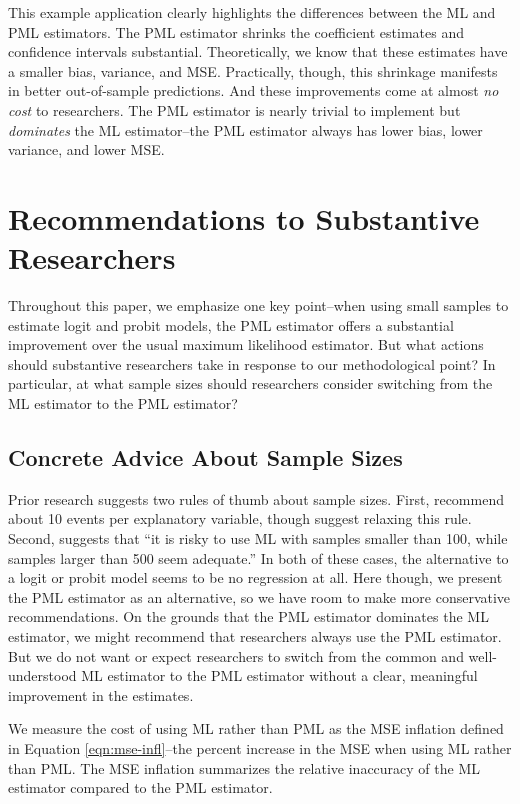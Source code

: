 \documentclass[12pt]{article}
\begin{document}
This example application clearly highlights the differences between the ML and PML estimators. 
The PML estimator shrinks the coefficient estimates and confidence intervals substantial. 
Theoretically, we know that these estimates have a smaller bias, variance, and MSE.
Practically, though, this shrinkage manifests in better out-of-sample predictions.
And these improvements come at almost \textit{no cost} to researchers. 
The PML estimator is nearly trivial to implement but \textit{dominates} the ML estimator--the PML estimator always has lower bias, lower variance, and lower MSE.

\section*{Recommendations to Substantive Researchers}

Throughout this paper, we emphasize one key point--when using small samples to estimate logit and probit models, the PML estimator offers a substantial improvement over the usual maximum likelihood estimator. 
But what actions should substantive researchers take in response to our methodological point? 
In particular, at what sample sizes should researchers consider switching from the ML estimator to the PML estimator?

\subsection*{Concrete Advice About Sample Sizes}

Prior research suggests two rules of thumb about sample sizes.
First, \cite{Peduzzietal1996} recommend about 10 events per explanatory variable, though \cite{VittinghoffMcCulloch2007} suggest relaxing this rule. 
Second, \citet[p. 54]{Long1997} suggests that ``it is risky to use ML with samples smaller than 100, while samples larger than 500 seem adequate.'' 
In both of these cases, the alternative to a logit or probit model seems to be no regression at all.
Here though, we present the PML estimator as an alternative, so we have room to make more conservative recommendations.
On the grounds that the PML estimator dominates the ML estimator, we might recommend that researchers always use the PML estimator. 
But we do not want or expect researchers to switch from the common and well-understood ML estimator to the PML estimator without a clear, meaningful improvement in the estimates.

We measure the cost of using ML rather than PML as the MSE inflation defined in Equation \ref{eqn:mse-infl}--the percent increase in the MSE when using ML rather than PML. 
The MSE inflation summarizes the relative inaccuracy of the ML estimator compared to the PML estimator.
\end{document}
